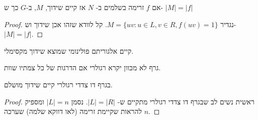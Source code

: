 \begin{claim}
אם $f$ זרימה בשלמים ב-%
$N$
אז קיים שידוך, $M$, ב-$G$ כך ש-%
$|M| = |f|$
\end{claim}

\begin{proof}
נגדיר
$M = \{uv : u \in L, v \in R, f(uv) = 1\}$.
קל לוודא שזהו אכן שידוך וש-%
$|M| = |f|$.
\end{proof}

\begin{corollary}
קיים אלגוריתם פולינומי שמוצא שידוך מקסימלי.
\end{corollary}

\begin{definition}
גרף לא מכוון יקרא רגולרי אם הדרגות של כל צמתיו שוות.
\end{definition}

\begin{claim}
בגרף דו צדדי רגולרי קיים שידוך מושלם.
\end{claim}

\begin{proof}
ראשית נשים לב שבגרף דו צדדי רגולרי מתקיים ש-%
$|L| = |R|$.
נסמן 
$|L| = n$
ומספיק להראות שקיימת זרימה (לאו דווקא שלמה) שערכה
$n$.
\end{proof}
